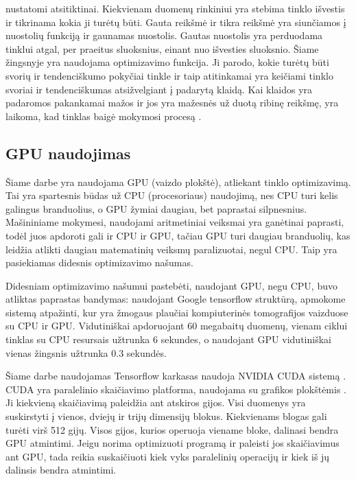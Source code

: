 \documentclass{VUMIFInfKursinis}
\begin{document}
nustatomi atsitiktinai. Kiekvienam duomenų rinkiniui yra stebima tinklo išvestis ir tikrinama kokia
ji turėtų būti. Gauta reikšmė ir tikra reikšmė yra siunčiamos į nuostolių funkciją ir gaunamas nuostolis. Gautas nuostolis yra perduodama tinklui atgal, per praeitus sluoksnius, einant nuo
išvesties sluoksnio. Šiame žingsnyje yra naudojama optimizavimo funkcija. Ji parodo, kokie turėtų būti
svorių ir tendenciškumo pokyčiai tinkle ir taip atitinkamai yra
keičiami tinklo svoriai ir tendenciškumas atsižvelgiant į padarytą klaidą. Kai klaidos
yra padaromos pakankamai mažos ir jos yra mažesnės už duotą ribinę reikšmę, yra laikoma, kad tinklas
baigė mokymosi procesą \cite{salt3}.

\subsection{GPU naudojimas}
\par
Šiame darbe yra naudojama GPU (vaizdo plokštė), atliekant tinklo optimizavimą. Tai yra spartesnis būdas už CPU (procesoriaus)
naudojimą, nes CPU turi kelis galingus branduolius, o GPU žymiai daugiau, bet paprastai silpnesnius. Mašininiame mokymesi,
naudojami aritmetiniai veiksmai yra ganėtinai paprasti, todėl juos apdoroti gali ir CPU ir GPU,
tačiau GPU turi daugiau branduolių, kas leidžia atlikti daugiau matematinių veiksmų paralizuotai,
negul CPU. Taip yra pasiekiamas didesnis optimizavimo našumas.
\par
Didesniam optimizavimo našumui pastebėti, naudojant GPU, negu CPU, buvo atliktas paprastas bandymas:
naudojant Google tensorflow struktūrą, apmokome sistemą atpažinti, kur yra žmogaus plaučiai kompiuterinės
tomografijos vaizduose su CPU ir GPU. Vidutiniškai apdoruojant 60 megabaitų duomenų, vienam ciklui
tinklas su CPU resursais užtrunka 6 sekundes, o naudojant GPU vidutiniškai vienas žingsnis užtrunka
0.3 sekundės.
\par
Šiame darbe naudojamas Tensorflow karkasas naudoja NVIDIA CUDA sistemą \cite{salt4}.
CUDA yra paralelinio skaičiavimo platforma, naudojama su grafikos plokštėmis \cite{salt5}.
Ji kiekvieną skaičiavimą paleidžia ant atskiros gijos. Visi duomenys yra suskirstyti
į vienos, dviejų ir trijų dimensijų blokus. Kiekvienams blogas gali turėti virš 512
gijų. Visos gijos, kurios operuoja viename bloke, dalinasi bendra GPU atmintimi.
Jeigu norima optimizuoti programą ir paleisti jos skaičiavimus ant GPU, tada reikia
suskaičiuoti kiek vyks paralelinių operacijų ir kiek iš jų dalinsis bendra atmintimi.
\end{document}
